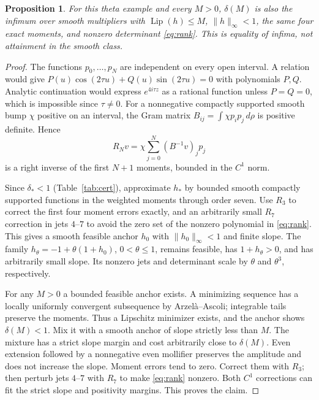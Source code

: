 \documentclass[11pt,a4paper]{article}
\numberwithin{equation}{section}
\newtheorem{proposition}[theorem]{Proposition}
\theoremstyle{remark}\newtheorem{remark}[theorem]{Remark}
\DeclareMathOperator{\Lip}{Lip}
\newcommand{\ds}{\delta_*}
\newcommand{\norm}[1]{\lVert#1\rVert}
\begin{document}
\begin{proposition}\label{prop:smooth}
For this theta example and every $M>0$, $\delta(M)$ is also the infimum
over smooth multipliers with $\Lip(h)\le M$, $\norm h_\infty<1$,
the same four exact moments, and nonzero determinant \eqref{eq:rank}.
This is equality of infima, not attainment in the smooth class.
\end{proposition}
\begin{proof}
The functions $p_0,\ldots,p_N$ are independent on every open interval.
A relation would give $P(u)\cos(2\tau u)+Q(u)\sin(2\tau u)=0$ with
polynomials $P,Q$. Analytic continuation would express $e^{4i\tau z}$
as a rational function unless $P=Q=0$, which is impossible since
$\tau\ne0$. For a nonnegative compactly supported smooth bump $\chi$
positive on an interval, the Gram matrix $B_{ij}=\int\chi p_ip_j\,d\rho$
is positive definite. Hence
\begin{equation}
 R_Nv=\chi\sum_{j=0}^N(B^{-1}v)_jp_j\label{eq:rightinverse}
\end{equation}
is a right inverse of the first $N+1$ moments, bounded in the $C^1$ norm.

Since $\ds<1$ (Table~\ref{tab:cert}), approximate $h_*$ by bounded smooth
compactly supported functions in the weighted moments through order seven.
Use $R_3$ to correct the first four moment errors exactly, and an
arbitrarily small $R_7$ correction in jets $4$--$7$ to avoid the zero set
of the nonzero polynomial in \eqref{eq:rank}. This gives a smooth
feasible anchor $h_0$ with $\norm{h_0}_\infty<1$ and finite slope.
The family $h_\theta=-1+\theta(1+h_0)$, $0<\theta\le1$, remains feasible,
has $1+h_\theta>0$, and has arbitrarily small slope. Its nonzero jets and
determinant scale by $\theta$ and $\theta^3$, respectively.

For any $M>0$ a bounded feasible anchor exists. A minimizing sequence
has a locally uniformly convergent subsequence by Arzel\`a--Ascoli;
integrable tails preserve the moments. Thus a Lipschitz minimizer exists,
and the anchor shows $\delta(M)<1$. Mix it with a smooth anchor of slope
strictly less than $M$. The mixture has a strict slope margin and cost
arbitrarily close to $\delta(M)$. Even extension followed by a nonnegative
even mollifier preserves the amplitude and does not increase the slope.
Moment errors tend to zero. Correct them with $R_3$; then perturb jets
$4$--$7$ with $R_7$ to make \eqref{eq:rank} nonzero. Both $C^1$ corrections
can fit the strict slope and positivity margins. This proves the claim.
\end{proof}
\end{document}
